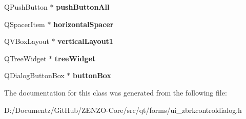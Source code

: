 \begin{DoxyCompactItemize}
\item 
\mbox{\label{class_ui___z_z_n_z_control_dialog_a5b6004f59d67e571a33bdfd3c4a42fb0}} 
Q\+Push\+Button $\ast$ {\bfseries push\+Button\+All}
\item 
\mbox{\label{class_ui___z_z_n_z_control_dialog_adf0d2e9ab628c0b6e515cd55e69d8502}} 
Q\+Spacer\+Item $\ast$ {\bfseries horizontal\+Spacer}
\item 
\mbox{\label{class_ui___z_z_n_z_control_dialog_a744334541520a51219979974c6054a3d}} 
Q\+V\+Box\+Layout $\ast$ {\bfseries vertical\+Layout1}
\item 
\mbox{\label{class_ui___z_z_n_z_control_dialog_a066ef4c0c23307761f46018b0bcfa0fd}} 
Q\+Tree\+Widget $\ast$ {\bfseries tree\+Widget}
\item 
\mbox{\label{class_ui___z_z_n_z_control_dialog_a61e6762e075d3ec87664e63be175c0dd}} 
Q\+Dialog\+Button\+Box $\ast$ {\bfseries button\+Box}
\end{DoxyCompactItemize}


The documentation for this class was generated from the following file\+:\begin{DoxyCompactItemize}
\item 
D\+:/\+Documentz/\+Git\+Hub/\+Z\+E\+N\+Z\+O-\/\+Core/src/qt/forms/ui\+\_\+zbrkcontroldialog.\+h\end{DoxyCompactItemize}
